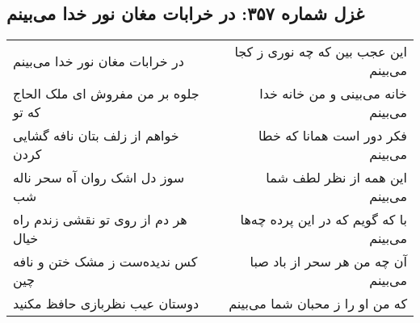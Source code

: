 \begin{center}
\section*{غزل شماره ۳۵۷: در خرابات مغان نور خدا می‌بینم}
\label{sec:sh357}
\begin{longtable}{l p{0.5cm} r}
در خرابات مغان نور خدا می‌بینم
&&
این عجب بین که چه نوری ز کجا می‌بینم
\\
جلوه بر من مفروش ای ملک الحاج که تو
&&
خانه می‌بینی و من خانه خدا می‌بینم
\\
خواهم از زلف بتان نافه گشایی کردن
&&
فکر دور است همانا که خطا می‌بینم
\\
سوز دل اشک روان آه سحر ناله شب
&&
این همه از نظر لطف شما می‌بینم
\\
هر دم از روی تو نقشی زندم راه خیال
&&
با که گویم که در این پرده چه‌ها می‌بینم
\\
کس ندیده‌ست ز مشک ختن و نافه چین
&&
آن چه من هر سحر از باد صبا می‌بینم
\\
دوستان عیب نظربازی حافظ مکنید
&&
که من او را ز محبان شما می‌بینم
\\
\end{longtable}
\end{center}
